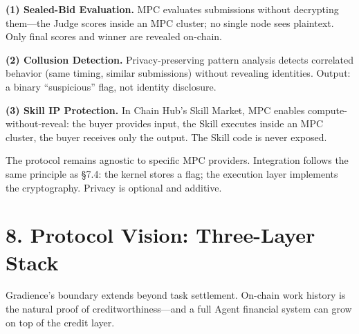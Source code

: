 \documentclass[11pt,a4paper]{article}
\begin{document}
\textbf{(1) Sealed-Bid Evaluation.} MPC evaluates submissions without decrypting them---the Judge scores inside an MPC cluster; no single node sees plaintext. Only final scores and winner are revealed on-chain.

\textbf{(2) Collusion Detection.} Privacy-preserving pattern analysis detects correlated behavior (same timing, similar submissions) without revealing identities. Output: a binary ``suspicious'' flag, not identity disclosure.

\textbf{(3) Skill IP Protection.} In Chain Hub's Skill Market, MPC enables compute-without-reveal: the buyer provides input, the Skill executes inside an MPC cluster, the buyer receives only the output. The Skill code is never exposed.

The protocol remains agnostic to specific MPC providers. Integration follows the same principle as \S7.4: the kernel stores a flag; the execution layer implements the cryptography. Privacy is optional and additive.

\section{8. Protocol Vision: Three-Layer Stack}

Gradience's boundary extends beyond task settlement. On-chain work history is the natural proof of creditworthiness---and a full Agent financial system can grow on top of the credit layer.

\begin{center}
\end{center}
\end{document}

